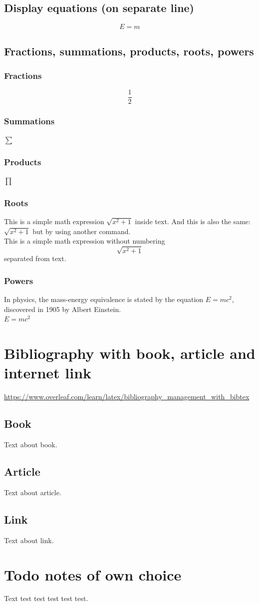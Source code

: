 \documentclass{report}
\begin{document}
    \section{Display equations (on separate line)}
    \begin{equation}
        E=m
    \end{equation}
    \section{Fractions, summations, products, roots, powers}
    \subsection{Fractions}
    \[\frac{1}{2}\]
    \subsection{Summations}
    $\sum$
    \subsection{Products}
    $\prod$
    \subsection{Roots}
    This is a simple math expression \(\sqrt{x^2+1}\) inside text. 
    And this is also the same: 
    \begin{math}
        \sqrt{x^2+1}
    \end{math}
    but by using another command.\\
    This is a simple math expression without numbering
    \[\sqrt{x^2+1}\] 
    separated from text.
    \subsection{Powers}
    In physics, the mass-energy equivalence is stated 
    by the equation $E=mc^2$, discovered in 1905 by Albert Einstein.\\
    $E=mc^2$
    
    \chapter{Bibliography with book, article and internet link}
    \url{https://www.overleaf.com/learn/latex/bibliography_management_with_bibtex}
    \section{Book}
    Text about book.\cite{book}
    \section{Article}
    Text about article.\cite{article}
    \section{Link}
    Text about link.\cite{link}
    
    \chapter{Todo notes of own choice}
    Text test test test test test. 

    
    
    
\end{document}
